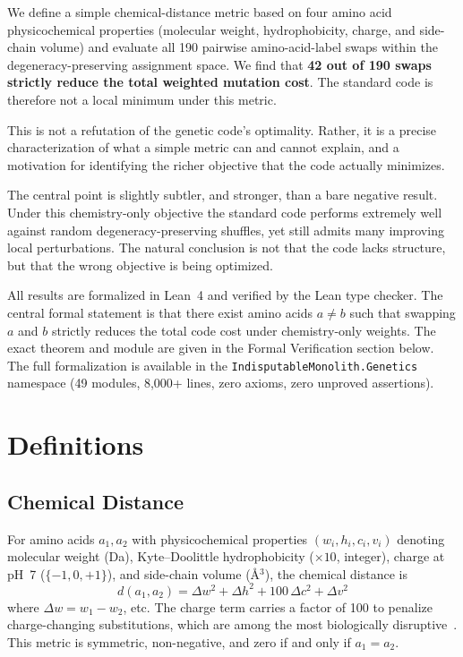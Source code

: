 \documentclass[11pt,twocolumn]{article}
\begin{document}
We define a simple chemical-distance metric based on four amino acid
physicochemical properties (molecular weight, hydrophobicity, charge, and
side-chain volume) and evaluate all 190 pairwise amino-acid-label swaps
within the degeneracy-preserving assignment space. We find that \textbf{42
out of 190 swaps strictly reduce the total weighted mutation cost}. The
standard code is therefore not a local minimum under this metric.

This is not a refutation of the genetic code's optimality. Rather, it is a
precise characterization of what a simple metric can and cannot explain,
and a motivation for identifying the richer objective that the code
actually minimizes.

The central point is slightly subtler, and stronger, than a bare negative
result. Under this chemistry-only objective the standard code performs
extremely well against random degeneracy-preserving shuffles, yet still
admits many improving local perturbations. The natural conclusion is not
that the code lacks structure, but that the wrong objective is being
optimized.

All results are formalized in Lean~4 and verified by the Lean type checker.
The central formal statement is that there exist amino acids $a \neq b$ such
that swapping $a$ and $b$ strictly reduces the total code cost under
chemistry-only weights. The exact theorem and module are given in the
Formal Verification section below. The full formalization is available in the
\texttt{IndisputableMonolith.Genetics} namespace (49 modules, 8,000+ lines,
zero axioms, zero unproved assertions).

\section{Definitions}

\subsection{Chemical Distance}

For amino acids $a_1, a_2$ with physicochemical properties
$(w_i, h_i, c_i, v_i)$ denoting molecular weight (Da), Kyte--Doolittle
hydrophobicity ($\times 10$, integer), charge at pH~7 ($\{-1, 0, +1\}$),
and side-chain volume (\AA$^3$), the chemical distance is
\begin{equation}\label{eq:chemdist}
  d(a_1, a_2) = \Delta w^2 + \Delta h^2 + 100\,\Delta c^2 + \Delta v^2
\end{equation}
where $\Delta w = w_1 - w_2$, etc. The charge term carries a factor of 100
to penalize charge-changing substitutions, which are among the most
biologically disruptive~\citep{Grantham1974}. This metric is symmetric,
non-negative, and zero if and only if $a_1 = a_2$.
\end{document}

